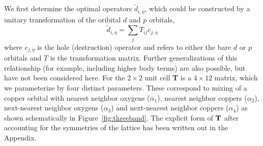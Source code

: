We first determine the optimal operators $\tilde{d}_{i,\eta}$, which could be constructed by a unitary transformation of the oribital $d$ and $p$ orbitals, 
\begin{equation}
	\tilde{d}_{i,\eta} = \sum_{j} T_{ij} c_{j,\eta}
\label{eq:dc}
\end{equation}
where $c_{j,\eta}$ is the hole (destruction) operator and refers to either the bare $d$ or $p$ orbitals and $T$ is the transformation matrix. 
Further generalizations of this relationship (for example, including higher body terms) are also possible, but have not been considered here. 
For the $2\times2$ unit cell {\bf T} is a $4 \times 12 $ matrix, which we parameterize by 
four distinct parameters. These correspond to mixing of a copper orbital 
with nearest neighbor oxygens ($\alpha_1$), nearest neighbor coppers ($\alpha_2$), next-nearest neighbor oxygens ($\alpha_3$) 
and next-nearest neighbor coppers ($\alpha_4$) as shown schematically in Figure~\ref{fig:threeband}. 
The explicit form of ${\bf T}$ after accounting for the symmetries of the 
lattice has been written out in the Appendix. %


